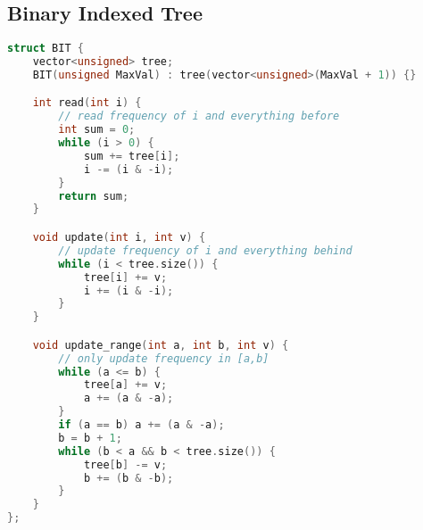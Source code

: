 \subsection{Binary Indexed Tree}
\begin{lstlisting}[language=C++]
struct BIT {
	vector<unsigned> tree;
	BIT(unsigned MaxVal) : tree(vector<unsigned>(MaxVal + 1)) {}

	int read(int i) {
		// read frequency of i and everything before
		int sum = 0;
		while (i > 0) {
			sum += tree[i];
			i -= (i & -i);
		}
		return sum;
	}

	void update(int i, int v) {
		// update frequency of i and everything behind
		while (i < tree.size()) {
			tree[i] += v;
			i += (i & -i);
		}
	}

	void update_range(int a, int b, int v) {
		// only update frequency in [a,b]
		while (a <= b) {
			tree[a] += v;
			a += (a & -a);
		}
		if (a == b) a += (a & -a);
		b = b + 1;
		while (b < a && b < tree.size()) {
			tree[b] -= v;
			b += (b & -b);
		}
	}
};
\end{lstlisting}
